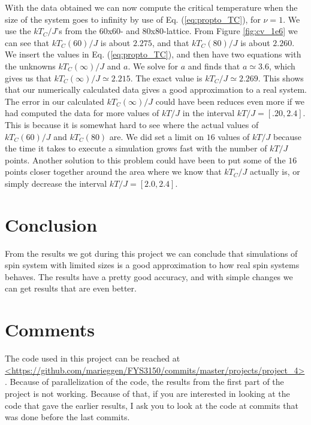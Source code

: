 \documentclass[12pt]{article}
\begin{document}
\begin{flushleft}
With the data obtained we can now compute the critical temperature when the size of the system goes to infinity by use of Eq. (\ref{eq:propto_TC}), for $\nu = 1$. We use the $kT_C/J$'s from the 60x60- and 80x80-lattice. From Figure \ref{fig:cv_1e6} we can see that $kT_C(60)/J$ is about $2.275$, and that $kT_C(80)/J$ is about $2.260$. We insert the values in Eq. (\ref{eq:propto_TC}), and then have two equations with the unknowns $kT_C(\infty)/J$ and $a$. We solve for $a$ and finds that $a \simeq 3.6$, which gives us that $kT_C(\infty)/J\simeq 2.215$. The exact value is $kT_C/J \simeq 2.269$. This shows that our numerically calculated data gives a good approximation to a real system. The error in our calculated $kT_C(\infty)/J$ could have been reduces even more if we had computed the data for more values of $kT/J$ in the interval $kT/J = [.20,2.4]$. This is because it is somewhat hard to see where the actual values of $kT_C(60)/J$ and $kT_C(80)$ are. We did set a limit on $16$ values of $kT/J$ because the time it takes to execute a simulation grows fast with the number of $kT/J$ points. Another solution to this problem could have been to put some of the $16$ points closer together around the area where we know that $kT_C/J$ actually is, or simply decrease the interval $kT/J = [2.0,2.4]$.
\newpage
\section{Conclusion}
From the results we got during this project we can conclude that simulations of spin system with limited sizes is a good approximation to how real spin systems behaves. The results have a pretty good accuracy, and with simple changes we can get results that are even better.
\section{Comments}
The code used in this project can be reached at\\ 
\url{<https://github.com/marieggen/FYS3150/commits/master/projects/project_4>}. Because of parallelization of the code, the results from the first part of the project is not working. Because of that, if you are interested in looking at the code that gave the earlier results, I ask you to look at the code at commits that was done before the last commits.

\end{flushleft}
\end{document}
